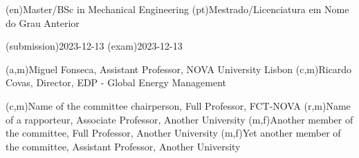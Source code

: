 \ntauthordegree(en){Master/BSc in Mechanical Engineering}
\ntauthordegree(pt){Mestrado/Licenciatura em Nome do Grau Anterior}

\ntdate(submission){2023-12-13}
\ntdate(exam){2023-12-13}

(a,m){Miguel Fonseca, Assistant Professor, NOVA University Lisbon}
(c,m){Ricardo Covas, Director, EDP - Global Energy Management}

(c,m){Name of the committee chairperson, Full Professor, FCT-NOVA}
(r,m){Name of a rapporteur, Associate Professor, Another University}
(m,f){Another member of the committee, Full Professor, Another University}
(m,f){Yet another member of the committee, Assistant Professor, Another University}
